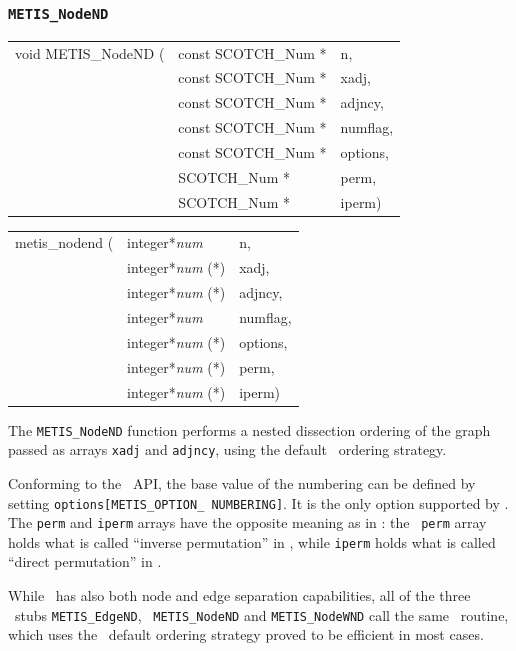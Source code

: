 \subsubsection{{\tt METIS\_NodeND}}

\begin{itemize}
\progsyn

{\tt\begin{tabular}{l@{}ll}
void METIS\_NodeND ( & const SCOTCH\_Num * & n,       \\
                     & const SCOTCH\_Num * & xadj,    \\
                     & const SCOTCH\_Num * & adjncy,  \\
                     & const SCOTCH\_Num * & numflag, \\
                     & const SCOTCH\_Num * & options, \\
                     & SCOTCH\_Num *       & perm,    \\
                     & SCOTCH\_Num *       & iperm)
\end{tabular}}

{\tt\begin{tabular}{l@{}ll}
metis\_nodend ( & integer*{\it num}     & n,       \\
                & integer*{\it num} (*) & xadj,    \\
                & integer*{\it num} (*) & adjncy,  \\
                & integer*{\it num}     & numflag, \\
                & integer*{\it num} (*) & options, \\
                & integer*{\it num} (*) & perm,    \\
                & integer*{\it num} (*) & iperm)
\end{tabular}}

\progdes

The {\tt METIS\_NodeND} function performs a nested dissection ordering
of the graph passed as arrays {\tt xadj} and {\tt adjncy}, using
the default \scotch\ ordering strategy.

Conforming to the \metis\ API, the base value of the numbering
can be defined by setting \texttt{options[METIS\_\lbt OPTION\_\lbt
NUMBERING]}. It is the only option supported by \scotch.
The {\tt perm} and {\tt iperm} arrays have the opposite meaning
as in \scotch: the \metis\ {\tt perm} array holds what is called
``inverse permutation'' in \scotch, while {\tt iperm} holds what is
called ``direct permutation'' in \scotch.

While \scotch\ has also both node and edge separation capabilities,
all of the three \metis\ stubs {\tt METIS\_\lbo EdgeND}, {\tt
METIS\_\lbo NodeND} and {\tt METIS\_\lbo NodeWND} call the same
\scotch\ routine, which uses the \scotch\ default ordering strategy
proved to be efficient in most cases.
\end{itemize}

